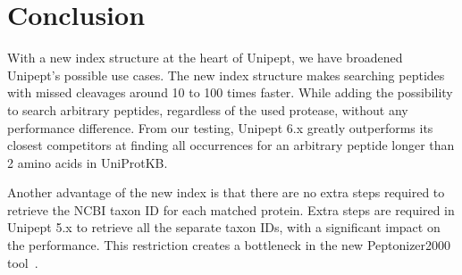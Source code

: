 \documentclass[11pt]{article}
\newenvironment{Table}
{\par\medskip\noindent\minipage{\linewidth}}
{\endminipage\par\medskip}
\begin{document}
\begin{multicols}{2}
        \begin{Table}
            \centering
            \label{tab:tool_comparison}
        \end{Table}


        \section{Conclusion}\label{sec:discussion}
        With a new index structure at the heart of Unipept, we have broadened Unipept's possible use cases.
        The new index structure makes searching peptides with missed cleavages around 10 to 100 times faster.
        While adding the possibility to search arbitrary peptides, regardless of the used protease, without any performance difference.
        From our testing, Unipept 6.x greatly outperforms its closest competitors at finding all occurrences for an arbitrary peptide longer than 2 amino acids in UniProtKB\@.

        Another advantage of the new index is that there are no extra steps required to retrieve the NCBI taxon ID for each matched protein.
        Extra steps are required in Unipept 5.x to retrieve all the separate taxon IDs, with a significant impact on the performance.
        This restriction creates a bottleneck in the new Peptonizer2000 tool~\cite{pep_gm}.


\end{multicols}
\end{document}
